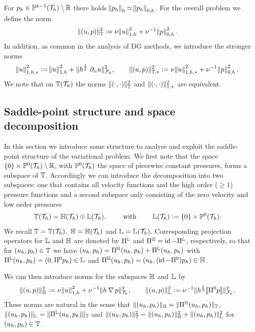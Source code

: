 \documentclass[pdflatex,sn-mathphys,Numbered]{sn-jnl}%
\theoremstyle{remark}%
\theoremstyle{definition}%
\begin{document}
For $p_h \in \mathbb{P}^{k-1}({\mathcal{T}_h}) \setminus \mathbb{R}$ there holds $\norm{p_h}_0 \simeq \norm{p_h}_{0,h}$.
For the overall problem we define the norm
\begin{align*}
  \Vert (u,p) \Vert_{\mathbb{T}}^2 := \nu \norm{u}_{1,h}^2 + \nu^{-1} \norm{p}_{0,h}^2.
\end{align*}
In addition, as common in the analysis of DG methods, we introduce the stronger norms
\begin{align*}
  \norm{u}_{1,h,\ast}^2 := \norm{u}_{1,h}^2 + \nrm{ h^{\frac12} \ \partial_n u}^2_{\Fh}, \qquad 
  \nrm{(u,p)}_{\TT,\ast}^2 := \nu \norm{u}_{1,h,\ast}^2 + \nu^{-1} \norm{p}_{0,h}^2.
\end{align*}
We note that on $\mathbb{T}({\mathcal{T}_h})$  the norms $\Vert (\cdot,\cdot) \Vert_{\mathbb{T}}^2$
and $\Vert (\cdot,\cdot) \Vert_{\mathbb{T},\ast}^2$ are equivalent.



\subsection{Saddle-point structure and space decomposition}
In this section we introduce some structure to analyse and exploit the saddle-point
structure of the variational problem. 
We first note that the space $\{0\} \times \mathbb{P}^0({\mathcal{T}_h}) \setminus \mathbb{R}$, with $\mathbb{P}^0({\mathcal{T}_h})$ the space of piecewise
constant pressures, forms a subspace of $\mathbb{T}$. Accordingly we can introduce the
decomposition into two subspaces: one that contains all velocity functions and
the high order ($\geq 1$) pressure functions and a second subspace only
consisting of the zero velocity and low order pressures 
\begin{equation}
\mathbb{T}({\mathcal{T}_h}) = \mathbb{H}({\mathcal{T}_h}) \oplus \mathbb{L}({\mathcal{T}_h}), 
\qquad 
\text{ with } 
\qquad
\mathbb{L}({\mathcal{T}_h}) := \{0\} \times
\mathbb{P}^0({\mathcal{T}_h}).
\end{equation}
We recall $\mathbb{T} = \mathbb{T}({\mathcal{T}_h})$, $\mathbb{H} = \mathbb{H}({\mathcal{T}_h})$ and $\mathbb{L} = \mathbb{L}({\mathcal{T}_h})$.
Corresponding projection operators for $\mathbb{L}$ and $\mathbb{H}$ are denoted by $\Pi^{\mathbb{L}}$ and
$\Pi^{\mathbb{H}} = \operatorname{id} -  \Pi^{\mathbb{L}}$, respectively, 
so that for $(u_h,p_h) \in \mathbb{T}$ we have $(u_h,p_h) = \Pi^{\mathbb{H}}(u_h,p_h) + \Pi^{\mathbb{L}}(u_h,p_h)$ with $  \Pi^{\mathbb{L}}(u_h,p_h) = (0, \Pi^0 p_h) \in \mathbb{L}$ and $ \Pi^{\mathbb{H}} (u_h, p_h) = (u_h, (\operatorname{id} - \Pi^0) p_h)\in \mathbb{H}$. 

We can then introduce norms for the subspaces $\mathbb{H}$ and $\mathbb{L}$ by
\begin{align}
  \Vert (u,p) \Vert_{\mathbb{H}}^2 := \nu \norm{u}_{1,h}^2 + \nu^{-1} \Vert h \operatorname{\nabla} p \Vert_{{\mathcal{T}_h}}^2,  \qquad
  \Vert (u,p) \Vert_{\mathbb{L}}^2 := \nu^{-1} \Vert h^\frac12 [\![\Pi^0 p]\!] \Vert_{{\mathcal{F}_h}}^2.
\end{align}
These norms are natural in the sense that $\Vert (u_h,p_h) \Vert_{\mathbb{H}} =
\Vert \Pi^{\mathbb{H}}(u_h,p_h) \Vert_{\mathbb{T}}$,  $\Vert (u_h,p_h) \Vert_{\mathbb{L}} =
\Vert \Pi^{\mathbb{L}}(u_h,p_h) \Vert_{\mathbb{T}}$
and 
$
\Vert (u_h,p_h) \Vert_{\mathbb{T}}^2 = \Vert (u_h,p_h) \Vert_{\mathbb{H}}^2 +   \Vert (u_h,p_h) \Vert_{\mathbb{L}}^2
$
for $(u_h,p_h) \in \mathbb{T}$.
\end{document}
